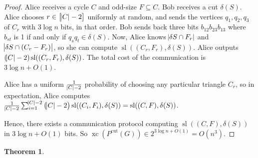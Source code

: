 \documentclass{article}
\newtheorem{theorem}{Theorem}
\DeclareMathOperator{\xc}{xc}
\DeclareMathOperator{\Sl}{sl}
\begin{document}
\begin{proof}
Alice receives a cycle $C$ and odd-size $F\subseteq C$. Bob receives
a cut $\delta(S)$. Alice chooses $r\in \sbr{\abs{C}-2}$ uniformly
at random, and sends the vertices $q_1,q_2,q_3$ of $C_r$ with $3\log n$ bits,
in that order.
Bob sends back three bits $b_{12}b_{23}b_{13}$ where $b_{st}$ is 1
if and only if $q_sq_t \in\delta(S)$.
Now, Alice knows $\abs{\delta{S}\cap F_r}$ and $\abs{\delta{S}\cap (C_r-F_r)}$,
so she can compute $\Sl((C_r, F_r),\delta(S))$. Alice outputs
$(\abs{C}-2)\Sl((C_r,F_r),\delta(S))$. The total cost
of the communication is $3\log n + O(1)$.

Alice has a uniform $\frac{1}{\abs{C}-2}$ probability of choosing
any particular triangle $C_r$, so in expectation, Alice computes
$\frac{1}{\abs{C}-2}\sum_{i=1}^{\abs{C}-2}\del{\abs{C}-2}\Sl((C_i,F_i),\delta(S)) = \Sl((C,F), \delta(S))$. 

Hence, there exists a communication protocol computing 
$\Sl((C,F), \delta(S))$ in $3\log n+O(1)$ bits. 
So $\xc(P^{\text{cut}}(G)) \in 2^{3\log n + O(1)} = O(n^3)$. 
\end{proof}

\begin{theorem}

\end{theorem}
\end{document}
